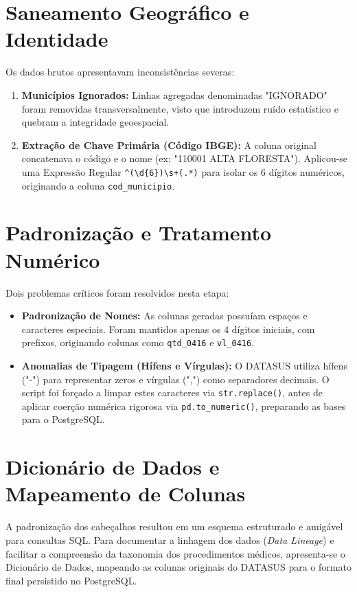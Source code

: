 \documentclass[12pt,a4paper]{report}
\begin{document}
\section{Saneamento Geográfico e Identidade}
Os dados brutos apresentavam inconsistências severas:
\begin{enumerate}
\item \textbf{Municípios Ignorados:} Linhas agregadas denominadas "IGNORADO" foram removidas transversalmente, visto que introduzem ruído estatístico e quebram a integridade geoespacial.
\item \textbf{Extração de Chave Primária (Código IBGE):} A coluna original concatenava o código e o nome (ex: "110001 ALTA FLORESTA"). Aplicou-se uma Expressão Regular \texttt{\textasciicircum(\textbackslash d\{6\})\textbackslash s+(.*)} para isolar os 6 dígitos numéricos, originando a coluna \texttt{cod\_municipio}.
\end{enumerate}

\section{Padronização e Tratamento Numérico}
Dois problemas críticos foram resolvidos nesta etapa:
\begin{itemize}
\item \textbf{Padronização de Nomes:} As colunas geradas possuíam espaços e caracteres especiais. Foram mantidos apenas os 4 dígitos iniciais, com prefixos, originando colunas como \texttt{qtd\_0416} e \texttt{vl\_0416}.
\item \textbf{Anomalias de Tipagem (Hífens e Vírgulas):} O DATASUS utiliza hífens ("-") para representar zeros e vírgulas (",") como separadores decimais. O script foi forçado a limpar estes caracteres via \texttt{str.replace()}, antes de aplicar coerção numérica rigorosa via \texttt{pd.to\_numeric()}, preparando as bases para o PostgreSQL.
\end{itemize}

\section{Dicionário de Dados e Mapeamento de Colunas}
A padronização dos cabeçalhos resultou em um esquema estruturado e amigável para consultas SQL. Para documentar a linhagem dos dados (\textit{Data Lineage}) e facilitar a compreensão da taxonomia dos procedimentos médicos, apresenta-se o Dicionário de Dados, mapeando as colunas originais do DATASUS para o formato final persistido no PostgreSQL.
\end{document}
